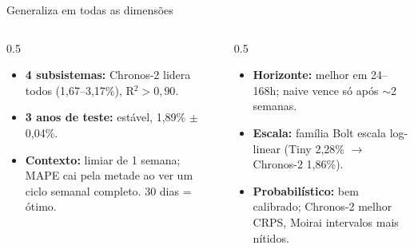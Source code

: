 \documentclass[aspectratio=169,10pt]{beamer}
\newcommand{\hl}[1]{\textcolor{hl}{\textbf{#1}}}
\begin{document}
\begin{frame}{Generaliza em todas as dimensões}
  \begin{columns}[T]
    \begin{column}{0.5\textwidth}
      \begin{itemize}
        \item \hl{4 subsistemas:} Chronos-2 lidera todos (1,67--3,17\%), R$^2 > 0{,}90$.
        \item \hl{3 anos de teste:} estável, 1,89\% $\pm$ 0,04\%.
        \item \hl{Contexto:} limiar de 1 semana; MAPE cai pela metade ao ver um ciclo semanal completo. 30 dias = ótimo.
      \end{itemize}
    \end{column}
    \begin{column}{0.5\textwidth}
      \begin{itemize}
        \item \hl{Horizonte:} melhor em 24--168h; naive vence só após $\sim$2 semanas.
        \item \hl{Escala:} família Bolt escala log-linear (Tiny 2,28\% $\to$ Chronos-2 1,86\%).
        \item \hl{Probabilístico:} bem calibrado; Chronos-2 melhor CRPS, Moirai intervalos mais nítidos.
      \end{itemize}
    \end{column}
  \end{columns}
\end{frame}
\end{document}
